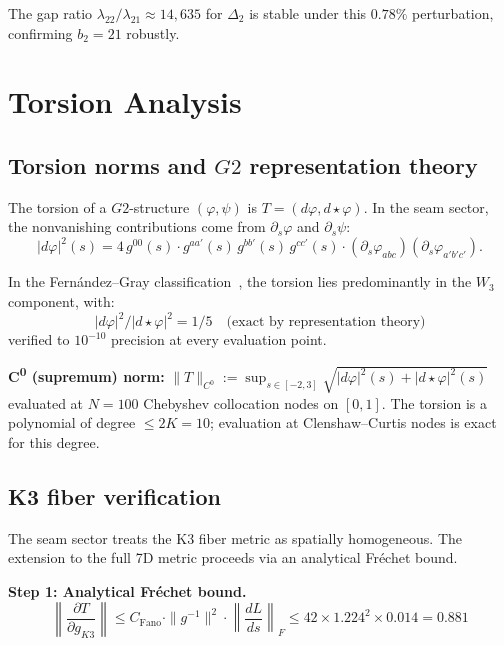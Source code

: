 \documentclass[11pt,a4paper]{article}
\theoremstyle{definition}
\theoremstyle{remark}
\newcommand{\Gtwo}{\mathrm{G}_2}
\def\Gtwo{G2}%
\begin{document}
The gap ratio $\lambda_{22}/\lambda_{21} \approx 14{,}635$ for $\Delta_2$ is stable under this $0.78\%$ perturbation, confirming $b_2 = 21$ robustly.

\section{Torsion Analysis}\label{sec:torsion}

\subsection{Torsion norms and $\Gtwo$ representation theory}

The torsion of a $\Gtwo$-structure $(\varphi, \psi)$ is $T = (d\varphi, d\star\varphi)$. In the seam sector, the nonvanishing contributions come from $\partial_s \varphi$ and $\partial_s \psi$:
\begin{equation}
|d\varphi|^2(s) = 4\, g^{00}(s) \cdot g^{aa'}(s)\, g^{bb'}(s)\, g^{cc'}(s) \cdot (\partial_s \varphi_{abc})(\partial_s \varphi_{a'b'c'}).
\end{equation}

In the Fern\'andez--Gray classification~\cite{FernandezGray1982}, the torsion lies predominantly in the $W_3$ component, with:
\begin{equation}
|d\varphi|^2 / |d\star\varphi|^2 = 1/5 \quad \text{(exact by representation theory)}
\end{equation}
verified to $10^{-10}$ precision at every evaluation point.

\textbf{C\textsuperscript{0} (supremum) norm:}
$\|T\|_{C^0} := \sup_{s \in [-2,3]} \sqrt{|d\varphi|^2(s) + |d\star\varphi|^2(s)}$
evaluated at $N = 100$ Chebyshev collocation nodes on $[0, 1]$. The torsion is a polynomial of degree $\leq 2K = 10$; evaluation at Clenshaw--Curtis nodes is exact for this degree.

\subsection{K3 fiber verification}\label{sec:frech}

The seam sector treats the K3 fiber metric as spatially homogeneous. The extension to the full 7D metric proceeds via an analytical Fr\'echet bound.

\textbf{Step 1: Analytical Fr\'echet bound.}
\begin{equation}
\left\|\frac{\partial T}{\partial g_{K3}}\right\| \leq C_{\mathrm{Fano}} \cdot \|g^{-1}\|^2 \cdot \left\|\frac{dL}{ds}\right\|_F \leq 42 \times 1.224^2 \times 0.014 = 0.881
\end{equation}
\end{document}
